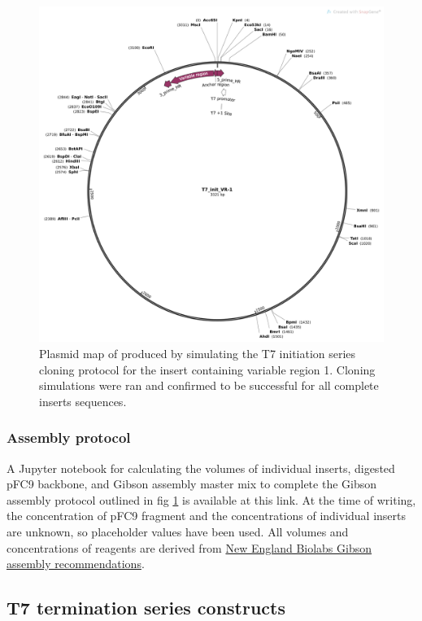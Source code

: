 \documentclass[11pt]{article}
\begin{document}
\begin{figure}[H]
	\includegraphics[width=12cm]{images/plasmid_maps/T7_init_vr-1_simulated_assembly.png}
	\centering
	\caption{Plasmid map of produced by simulating the T7 initiation series cloning protocol for the insert containing variable region 1. Cloning simulations were ran and confirmed to be successful for all complete inserts sequences.}
	\label{clone:T7-insert-simulated}
\end{figure}

\subsubsection{Assembly protocol}

A Jupyter notebook for calculating the volumes of individual inserts, digested pFC9 backbone, and Gibson assembly master mix to complete the Gibson assembly protocol outlined in fig \ref{clone:T7-insert-simulated} is available at this link. At the time of writing, the concentration of pFC9 fragment and the concentrations of individual inserts are unknown, so placeholder values have been used. All volumes and concentrations of reagents are derived from \href{https://www.neb.com/protocols/2012/12/11/gibson-assembly-protocol-e5510}{New England Biolabs Gibson assembly recommendations}.


\subsection{T7 termination series constructs}
\end{document}
